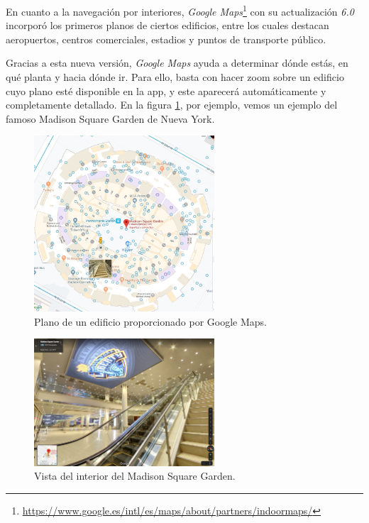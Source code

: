 \documentclass{article}
\begin{document}
		En cuanto a la navegación por interiores, \textit{Google Maps}\footnote{\url{https://www.google.es/intl/es/maps/about/partners/indoormaps/}} con su actualización \textit{6.0} incorporó los primeros planos de ciertos edificios, entre los cuales destacan aeropuertos, centros comerciales, estadios y puntos de transporte público.
		
		Gracias a esta nueva versión, \textit{Google Maps} ayuda a determinar dónde estás, en qué planta y hacia dónde ir. Para ello, basta con hacer zoom sobre un edificio cuyo plano esté disponible en la app, y este aparecerá automáticamente y completamente detallado. En la figura \ref{fig:ejemplo}, por ejemplo, vemos un ejemplo del famoso Madison Square Garden de Nueva York. 
		
		 \begin{figure}[t]
			\centering
			\includegraphics[width=0.6\textwidth]{MadSq2}
			\caption{Plano de un edificio proporcionado por Google Maps.}
			\label{fig:ejemplo}
		\end{figure}
		
		 \begin{figure}[t]
			\centering
			\includegraphics[width=0.6\textwidth]{MadSq3}
			\caption{Vista del interior del Madison Square Garden. }
			\label{fig:ejemplo2}
		\end{figure}
	    
\end{document}
